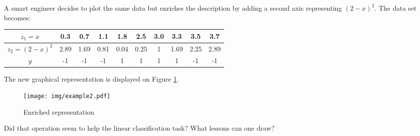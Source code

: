 \documentclass{article}
\begin{document}
A smart engineer decides to plot the same data but enriches the description by adding a second axis representing $(2-x)^2$. The data set becomes:

\begin{tabular}{|c|c|c|c|c|c|c|c|c|c|}
\hline
$z_1=x$ & 0.3 & 0.7 & 1.1 & 1.8 & 2.5 & 3.0 & 3.3 & 3.5 & 3.7 \\
\hline
$z_2=(2-x)^2$ & 2.89 & 1.69 & 0.81 & 0.04 & 0.25 & 1 & 1.69 & 2.25 & 2.89\\
\hline
$y$ & -1  & -1  &  -1 &  1  &  1  &  1  & 1   & -1  & -1\\
\hline
\end{tabular}
The new graphical representation is displayed on Figure \ref{fig:2}.
\begin{figure}[h!]
\begin{center}
\texttt{[image: img/example2.pdf]}
\end{center}
\label{fig:2}
\caption{Enriched representation}
\end{figure}

\noindent {} Did that operation seem to help the linear classification task? What lessons can one draw?
\end{document}

